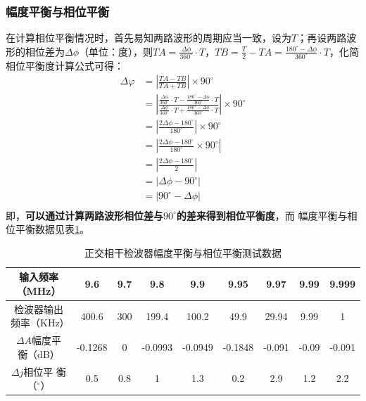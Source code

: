 \documentclass[12pt]{article}
\begin{document}
\subsubsection{幅度平衡与相位平衡}
在计算相位平衡情况时，首先易知两路波形的周期应当一致，设为$T$；再设两路波形的相位差为$\Delta\phi$（单位：度），则$TA={\frac{\Delta\phi}{360^\circ}\cdot T}$，$TB=\frac{T}{2}-TA={\frac{180^\circ-\Delta\phi}{360^\circ}\cdot T}$，化简相位平衡度计算公式可得：
\begin{equation}
\begin{array}{rl}
 \Delta\varphi&=\left|\frac{TA-TB}{TA+TB}\right|\times 90^\circ \\
 &=\left|\frac{{\frac{\Delta\phi}{360^\circ}\cdot T}-{\frac{180^\circ-\Delta\phi}{360^\circ}}\cdot T}{{\frac{\Delta\phi}{360^\circ}\cdot T}+{\frac{180^\circ-\Delta\phi}{360^\circ}}\cdot T}\right|\times 90^\circ \\
 &=\left|\frac{2\Delta\phi-180^\circ}{180^\circ}\right|\times 90^\circ \\
 &=\left|\frac{2\Delta\phi-180^\circ}{180^\circ}\times 90^\circ\right| \\
 &=\left|\frac{2\Delta\phi-180^\circ}{2}\right|  \\
  &=\left|{\Delta\phi-90^\circ}\right|  \\
  &=\left|90^\circ-\Delta\phi\right|  \\
\end{array}
\end{equation}
即，\textbf{\textcolor[RGB]{255,0,0}{可以通过计算两路波形相位差与$90^\circ$的差来得到相位平衡度}}，而
幅度平衡与相位平衡数据见表\ref{tab:addlabelfxbphd1}。\par
\begin{table}[htbp]
  \centering
  \caption{正交相干检波器幅度平衡与相位平衡测试数据}
    \begin{tabular}{|c|c|c|c|c|c|c|c|c|}
    \hline
    输入频率（MHz） & 9.6 & 9.7 & 9.8 & 9.9 & 9.95 & 9.97 & 9.99 & 9.999 \\
    \hline
    检波器输出频率（KHz） & 400.6 & 300 & 199.4 & 100.2 & 49.9 & 29.94 & 9.99 & 1 \\
    \hline
    $\Delta A $幅度平 衡（dB） & -0.1268 & 0 & -0.0993 & -0.0949 & -0.1848 & -0.091 & -0.09 & -0.091 \\
    \hline
    $\Delta j $相位平 衡（$ ^\circ$） & 0.5 & 0.8 & 1 & 1.3 & 0.2 & 2.9 & 1.2 & 2.2 \\
    \hline
    \end{tabular}%
  \label{tab:addlabelfxbphd1}%
\end{table}%
\end{document}
